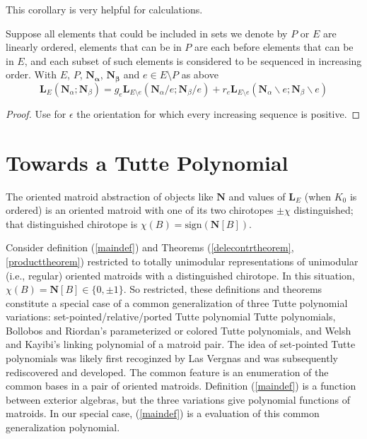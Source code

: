 \documentclass[Unicode]{cedram-alco}
\newcommand{\ext}[1]{\ensuremath{\mathbf{#1}}}
\newcommand{\eNal}{\ensuremath{\ext{N}_{\alpha}}}
\newcommand{\eNbe}{\ensuremath{\ext{N}_\beta}}
\newcommand{\extLHorSub}[3]{\ext{L}_{#1}\left(  {#2}; {#3}  \right)}
\begin{document}
This corollary is very helpful for calculations.

\begin{coro}
  Suppose all elements that could be included in sets we denote by $P$ or $E$ are linearly ordered,
  elements that can be in $P$ are each before elements that can be in $E$,
  and each subset of such elements is considered to be sequenced in increasing order.  With
  $E$, $P$, $\ext{N_\alpha}$, $\ext{N_\beta}$ and $e\in E\setminus P$ as above
  \begin{equation}
       \extLHorSub{E}{\eNal}{\eNbe}=
      g_e\extLHorSub{E\setminus e}{\eNal/e}{\eNbe/e} +
      r_e\extLHorSub{E\setminus e}{\eNal\backslash e}{\eNbe\backslash e}
  \end{equation}
\end{coro}
\begin{proof}
  Use for $\epsilon$ the orientation for which every increasing sequence is positive.
\end{proof}

\section{Towards a Tutte Polynomial}


The oriented matroid abstraction of objects like $\ext{N}$ and values of $\ext{L}_E$
(when $K_0$ is ordered) is an oriented matroid with one of its two chirotopes $\pm \chi$ distinguished; that
distinguished chirotope is $\chi(B) = \text{sign}(\ext{N}[B])$.

Consider definition (\ref{maindef}) and Theorems (\ref{delecontrtheorem},\ref{producttheorem})
restricted to totally unimodular representations of unimodular (i.e., regular) oriented matroids
with a distinguished chirotope.  In this situation,  $\chi(B) = \ext{N}[B]\in \{0,\pm 1\}$.
So restricted, these definitions and theorems constitute a special case
of a common generalization of three Tutte polynomial variations:
set-pointed/relative/ported Tutte polynomial
Tutte polynomials, 
Bollobos and Riordan's parameterized or colored Tutte polynomials\cite{BollobasRiordanTuttePolyColored},
and Welsh and Kayibi's linking
polynomial of a matroid pair\cite{WelshKayibiLinking}. The idea of set-pointed Tutte polynomials
was likely first recoginzed by Las Vergnas\cite{MR0419272}
and was subsequently rediscovered and developed\cite{sdcPorted,SetPointedLV,RelTuttePolyDiaoHetyei}.
The common feature is an enumeration
of the common bases in a pair of oriented matroids.  Definition (\ref{maindef}) is a function between
exterior algebras, but the three variations give polynomial functions of matroids.  In our special
case, (\ref{maindef}) is a evaluation of this common generalization polynomial. 
\end{document}
